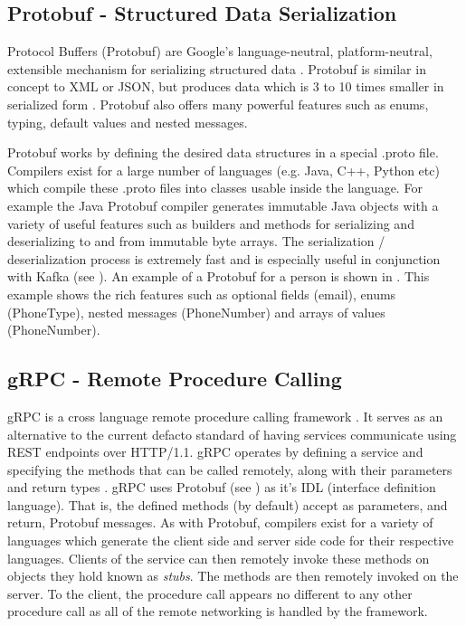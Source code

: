 \subsection{Protobuf - Structured Data Serialization}\label{sec:protobuf}
Protocol Buffers (Protobuf) are Google's language-neutral, platform-neutral, extensible mechanism for serializing structured data \cite{protobuf}. Protobuf is similar in concept to XML or JSON, but produces data which is 3 to 10 times smaller in serialized form \cite{protobufSizeStat}. Protobuf also offers many powerful features such as enums, typing, default values and nested messages.

Protobuf works by defining the desired data structures in a special .proto file. Compilers exist for a large number of languages (e.g. Java, C++, Python etc) which compile these .proto files into classes usable inside the language. For example the Java Protobuf compiler generates immutable Java objects with a variety of useful features such as builders and methods for serializing and deserializing to and from immutable byte arrays. The serialization / deserialization process is extremely fast and is especially useful in conjunction with Kafka (see ). An example of a Protobuf for a person is shown in . This example shows the rich features such as optional fields (email), enums (PhoneType), nested messages (PhoneNumber) and arrays of values (PhoneNumber).



\subsection{gRPC - Remote Procedure Calling}
gRPC is a cross language remote procedure calling framework \cite{gRPC}. It serves as an alternative to the current defacto standard of having services communicate using REST endpoints over HTTP/1.1. gRPC operates by defining a service and specifying the methods that can be called remotely, along with their parameters and return types \cite{gRPCDef}. gRPC uses Protobuf (see ) as it's IDL (interface definition language). That is, the defined methods (by default) accept as parameters, and return, Protobuf messages. As with Protobuf, compilers exist for a variety of languages which generate the client side and server side code for their respective languages. Clients of the service can then remotely invoke these methods on objects they hold known as \textit{stubs}. The methods are then remotely invoked on the server. To the client, the procedure call appears no different to any other procedure call as all of the remote networking is handled by the framework. 

